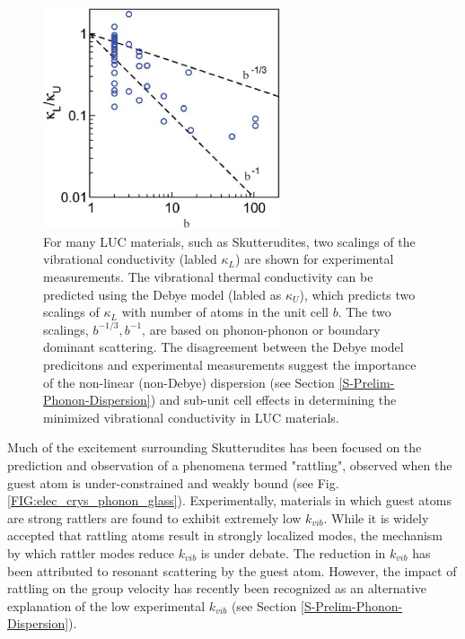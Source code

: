 \documentclass[letterpaper,12pt]{article}
\begin{document}
\begin{figure}
\begin{center}
\includegraphics[angle=0,width=70.0mm]{snyder_kl_ku-1.eps}
\vspace*{-5mm}
\end{center}
\caption{\label{FIG:snyder-kl} For many LUC materials, such as Skutterudites, two scalings of the vibrational conductivity
(labled $\kappa_{L}$) are shown for experimental measurements.\cite{Toberer2011} The vibrational thermal conductivity can be predicted using the Debye model (labled as $\kappa_{U}$), which predicts two
scalings of $\kappa_{L}$ with number of atoms in the unit cell $b$. The two scalings, $b^{-1/3},b^{-1}$, are based on phonon-phonon or boundary dominant scattering.\cite{Toberer2011} The disagreement between the Debye model predicitons and experimental measurements suggest the importance of the non-linear (non-Debye) dispersion (see Section \ref{S-Prelim-Phonon-Dispersion}) and sub-unit cell effects in determining the minimized vibrational conductivity in LUC materials.}
\end{figure}

Much of the excitement surrounding Skutterudites has been
focused on the prediction and observation of a phenomena termed "rattling", observed when the guest atom
is under-constrained and weakly bound (see Fig. \ref{FIG:elec_crys_phonon_glass}).\cite{keppens1998,Sales_Chakoumakos_Mandrus_Sharp_1999,doi:10.1021/ja063695y} Experimentally, materials in which guest atoms are strong rattlers are found to exhibit extremely low $k_{vib}$.\cite{Sales_Chakoumakos_Mandrus_Sharp_1999,qiu:063713} While it is widely accepted that rattling atoms result in strongly localized modes, the mechanism by which rattler modes reduce $k_{vib}$ is under debate. The reduction in $k_{vib}$ has been attributed to resonant scattering by the guest atom.\cite{PhysRevLett.82.779} However, the impact of rattling on the group velocity has recently been recognized as an alternative explanation of the low experimental $k_{vib}$ (see Section \ref{S-Prelim-Phonon-Dispersion}).\cite{Yang_Chen_2006,Christensen2008}
\end{document}
